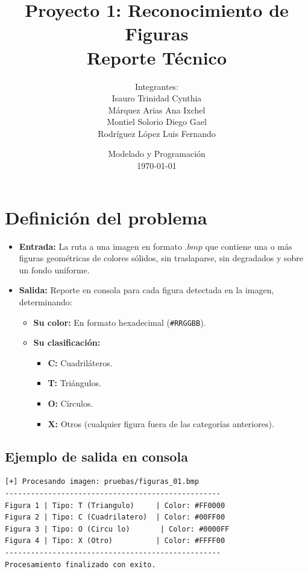 \documentclass[11pt]{article}
\title{\textbf{Proyecto 1: Reconocimiento de Figuras} \\ \large \textbf{Reporte Técnico}}
\author{
    Integrantes:
    \\Isauro Trinidad Cynthia
    \\Márquez Arias Ana Ixchel 
    \\Montiel Solorio Diego Gael 
    \\Rodríguez López Luis Fernando
}
\date{Modelado y Programación \\ \today}
\begin{document}
\maketitle

\section{Definición del problema}

\begin{itemize}
    \item \textbf{Entrada:} La ruta a una imagen en formato $.bmp$ que contiene una o más figuras geométricas de colores sólidos, sin traslaparse, sin degradados y sobre un fondo uniforme.
    \item \textbf{Salida:} Reporte en consola para cada figura detectada en la imagen, determinando:
    \begin{itemize}
        \item \textbf{Su color:} En formato hexadecimal (\texttt{\#RRGGBB}).
        \item \textbf{Su clasificación:}
        \begin{itemize}
            \item \textbf{C:} Cuadriláteros.
            \item \textbf{T:} Triángulos.
            \item \textbf{O:} Círculos.
            \item \textbf{X:} Otros (cualquier figura fuera de las categorías anteriores).
        \end{itemize}
    \end{itemize}
\end{itemize}

\subsection*{Ejemplo de salida en consola}
\begin{lstlisting}[basicstyle=\ttfamily\small, frame=single, backgroundcolor=\color{gray!10}]
[+] Procesando imagen: pruebas/figuras_01.bmp
--------------------------------------------------
Figura 1 | Tipo: T (Triangulo)     | Color: #FF0000
Figura 2 | Tipo: C (Cuadrilatero)  | Color: #00FF00
Figura 3 | Tipo: O (Circu lo)       | Color: #0000FF
Figura 4 | Tipo: X (Otro)          | Color: #FFFF00
--------------------------------------------------
Procesamiento finalizado con exito.
\end{lstlisting}
\end{document}
